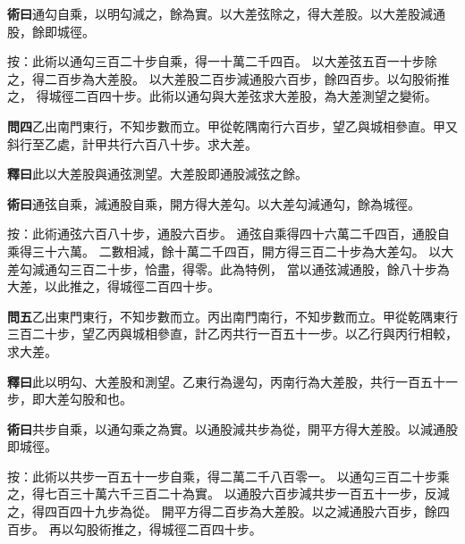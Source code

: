 \documentclass[12pt,a4paper]{article}
\begin{document}
\noindent\textbf{術曰}\quad 通勾自乘，以明勾減之，餘為實。以大差弦除之，得大差股。以大差股減通股，餘即城徑。

\vspace{0.3em}

\noindent
按：此術以通勾三百二十步自乘，得一十萬二千四百。
以大差弦五百一十步除之，得二百步為大差股。
以大差股二百步減通股六百步，餘四百步。以勾股術推之，
得城徑二百四十步。此術以通勾與大差弦求大差股，為大差測望之變術。

\vspace{0.5em}

\noindent\textbf{問四}\quad 乙出南門東行，不知步數而立。甲從乾隅南行六百步，望乙與城相參直。甲又斜行至乙處，計甲共行六百八十步。求大差。

\vspace{0.3em}

\noindent\textbf{釋曰}\quad 此以大差股與通弦測望。大差股即通股減弦之餘。

\vspace{0.3em}

\noindent\textbf{術曰}\quad 通弦自乘，減通股自乘，開方得大差勾。以大差勾減通勾，餘為城徑。

\vspace{0.3em}

\noindent
按：此術通弦六百八十步，通股六百步。
通弦自乘得四十六萬二千四百，通股自乘得三十六萬。
二數相減，餘十萬二千四百，開方得三百二十步為大差勾。
以大差勾減通勾三百二十步，恰盡，得零。此為特例，
當以通弦減通股，餘八十步為大差，以此推之，得城徑二百四十步。

\vspace{0.5em}

\noindent\textbf{問五}\quad 乙出東門東行，不知步數而立。丙出南門南行，不知步數而立。甲從乾隅東行三百二十步，望乙丙與城相參直，計乙丙共行一百五十一步。以乙行與丙行相較，求大差。

\vspace{0.3em}

\noindent\textbf{釋曰}\quad 此以明勾、大差股和測望。乙東行為邊勾，丙南行為大差股，共行一百五十一步，即大差勾股和也。

\vspace{0.3em}

\noindent\textbf{術曰}\quad 共步自乘，以通勾乘之為實。以通股減共步為從，開平方得大差股。以減通股即城徑。

\vspace{0.3em}

\noindent
按：此術以共步一百五十一步自乘，得二萬二千八百零一。
以通勾三百二十步乘之，得七百三十萬六千三百二十為實。
以通股六百步減共步一百五十一步，反減之，得四百四十九步為從。
開平方得二百步為大差股。以之減通股六百步，餘四百步。
再以勾股術推之，得城徑二百四十步。
\end{document}
